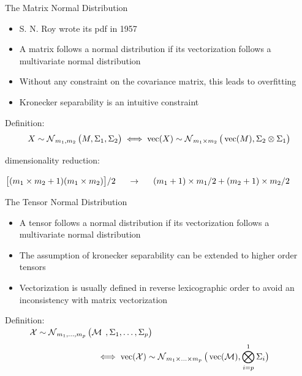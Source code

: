 \documentclass{beamer}
\begin{document}
\begin{frame}{The Matrix Normal Distribution}
\begin{itemize}
\item S. N. Roy wrote its pdf in 1957
\item A matrix follows a normal distribution if its vectorization follows a multivariate normal distribution
\item Without any constraint on the covariance matrix, this leads to overfitting 
\item Kronecker separability is an intuitive constraint
\end{itemize}
Definition:
$$
X \sim \operatorname{\mathcal N}_{m_1,m_2}\big(M,\Sigma_1, \Sigma_2 \big)
  \iff \operatorname{vec}(X) \sim \operatorname{\mathcal N}_{m_1 \times m_2} \big(\operatorname{vec}(M), \Sigma_2 \otimes \Sigma_1 \big)
$$
\begin{center}
dimensionality reduction:

$ \big[(m_1\times m_2 +1 ) (m_1\times m_2) \big]/2 \hspace{0.5cm} \rightarrow  \hspace{0.5cm} 
(m_1+1)\times m_1/2 + (m_2+1)\times m_2/2$
\end{center} 
\end{frame}

\begin{frame}{The Tensor Normal Distribution}
\begin{itemize}

\item A tensor follows a normal distribution if its vectorization follows a multivariate normal distribution

\item The assumption of kronecker separability can be extended to higher order tensors

\item Vectorization is usually defined in reverse lexicographic order to avoid an inconsistency with matrix vectorization
\end{itemize}
Definition:\\
$
\hspace{1cm} \mathcal X \sim \operatorname{\mathcal N}_{m_1,\hdots, m_p}\big(\mathcal M \hspace{0.15cm},\Sigma_1,\hdots,\Sigma_p\big)
  $\vspace*{-0.5cm} $$
 \hspace*{2cm} \iff \vecc(\mX) \sim \N_{m_1 \times\hdots\times m_p} \big(\vecc(\mM), \bigotimes_{i=p}^1 \Sigma_i \big)
\vspace*{-0.5cm}$$


\end{frame}
\end{document}
